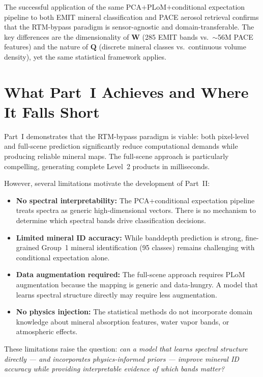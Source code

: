 \documentclass[11pt]{report}
\begin{document}
The successful application of the same PCA$+$PLoM$+$conditional expectation pipeline to both EMIT mineral classification and PACE aerosol retrieval confirms that the RTM-bypass paradigm is sensor-agnostic and domain-transferable. The key differences are the dimensionality of $\mathbf{W}$ (285 EMIT bands vs.\ $\sim$56M PACE features) and the nature of $\mathbf{Q}$ (discrete mineral classes vs.\ continuous volume density), yet the same statistical framework applies.

\section{What Part~I Achieves and Where It Falls Short}
\label{sec:part1_limitations}

Part~I demonstrates that the RTM-bypass paradigm is viable: both pixel-level and full-scene prediction significantly reduce computational demands while producing reliable mineral maps. The full-scene approach is particularly compelling, generating complete Level~2 products in milliseconds.

However, several limitations motivate the development of Part~II:
\begin{itemize}
  \item \textbf{No spectral interpretability:} The PCA+conditional expectation pipeline treats spectra as generic high-dimensional vectors. There is no mechanism to determine which spectral bands drive classification decisions.
  \item \textbf{Limited mineral ID accuracy:} While banddepth prediction is strong, fine-grained Group~1 mineral identification (95 classes) remains challenging with conditional expectation alone.
  \item \textbf{Data augmentation required:} The full-scene approach requires PLoM augmentation because the mapping is generic and data-hungry. A model that learns spectral structure directly may require less augmentation.
  \item \textbf{No physics injection:} The statistical methods do not incorporate domain knowledge about mineral absorption features, water vapor bands, or atmospheric effects.
\end{itemize}

These limitations raise the question: \emph{can a model that learns spectral structure directly --- and incorporates physics-informed priors --- improve mineral ID accuracy while providing interpretable evidence of which bands matter?}
\end{document}
